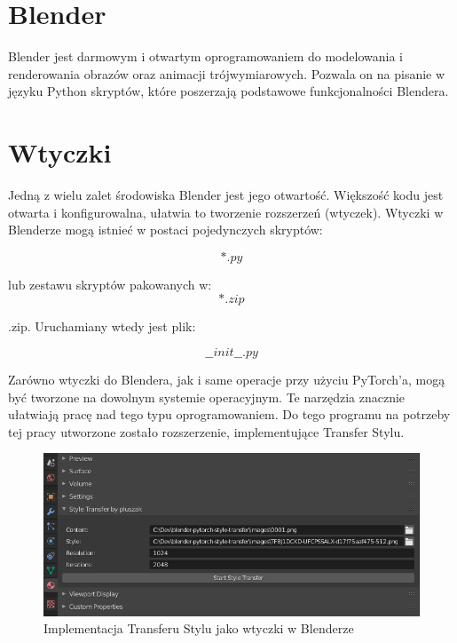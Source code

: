 \documentclass[openright]{xmgr}
\begin{document}
\section{Blender\label{s:dsssl}}

\indent \indent Blender jest darmowym i otwartym oprogramowaniem do modelowania i renderowania obrazów oraz animacji trójwymiarowych. Pozwala on na pisanie w języku Python skryptów, które poszerzają podstawowe funkcjonalności Blendera.

\section{Wtyczki\label{s:dsssl}}

\indent \indent Jedną z wielu zalet środowiska Blender jest jego otwartość. Większość kodu jest otwarta i konfigurowalna, ułatwia to tworzenie rozszerzeń (wtyczek). Wtyczki w Blenderze mogą istnieć w postaci pojedynczych skryptów:

\begin{equation}
*.py
\end{equation}

lub zestawu skryptów pakowanych w: 
\begin{equation}
*.zip
\end{equation}

.zip. Uruchamiany wtedy jest plik: 

\begin{equation}
\_\_init\_\_.py
\end{equation}

Zarówno wtyczki do Blendera, jak i same operacje przy użyciu PyTorch’a, mogą być tworzone na dowolnym systemie operacyjnym. Te narzędzia znacznie ułatwiają pracę nad tego typu oprogramowaniem. Do tego programu na potrzeby tej pracy utworzone zostało rozszerzenie, implementujące Transfer Stylu. 

\begin{figure}[!tbh]
\centering
\includegraphics[width=.8\hsize]{fig/9}
\caption{Implementacja Transferu Stylu jako wtyczki w Blenderze\label{RYS.9}}
\end{figure}
\end{document}
